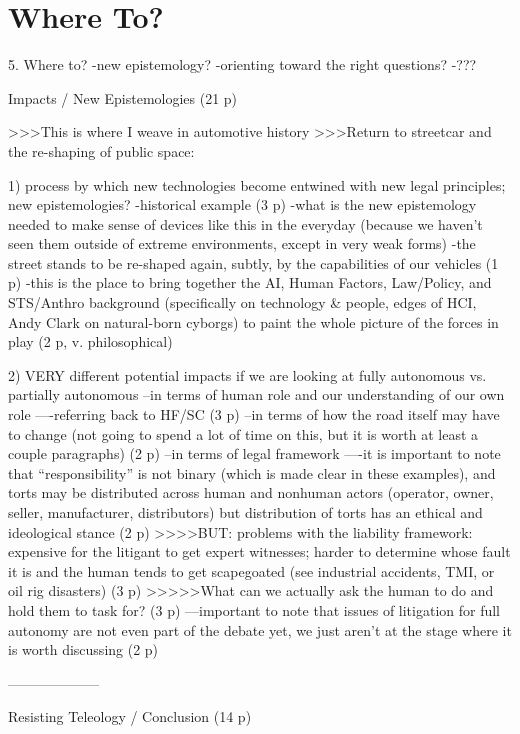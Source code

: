 \chapter{Where To?}

5. Where to?
-new epistemology?
-orienting toward the right questions?
-???

Impacts / New Epistemologies (21 p)

>>>This is where I weave in automotive history 
>>>Return to streetcar and the re-shaping of public space: 

1) process by which new technologies become entwined with new legal
principles; new epistemologies?
-historical example (3 p)
-what is the new epistemology needed to make sense of devices like
this in the everyday (because we haven't seen them outside of extreme
environments, except in very weak forms)
-the street stands to be re-shaped again, subtly, by the capabilities
of our vehicles (1 p)
-this is the place to bring together the AI, Human Factors,
Law/Policy, and STS/Anthro background (specifically on technology \&
people, edges of HCI, Andy Clark on natural-born cyborgs) to paint the
whole picture of the forces in play (2 p, v. philosophical)

2) VERY different potential impacts if we are looking at fully
autonomous vs. partially autonomous 
--in terms of human role and our understanding of our own role
----referring back to HF/SC (3 p)
--in terms of how the road itself may have to change (not going to
spend a lot of time on this, but it is worth at least a couple
paragraphs) (2 p)
--in terms of legal framework
----it is important to note that ``responsibility'' is not binary
(which is made clear in these examples), and torts may be distributed
across human and nonhuman actors (operator, owner, seller,
manufacturer, distributors) but distribution of torts has an ethical
and ideological stance (2 p)
>>>>BUT: problems with the liability framework: expensive for the
litigant to get expert witnesses; harder to determine whose fault it
is and the human tends to get scapegoated (see industrial accidents,
TMI, or oil rig disasters) (3 p)
>>>>>What can we actually ask the human to do and hold them to task
for? (3 p)
---important to note that issues of litigation for full autonomy are
not even part of the debate yet, we just aren't at the stage where it
is worth discussing (2 p)

--------------------

Resisting Teleology / Conclusion (14 p)

